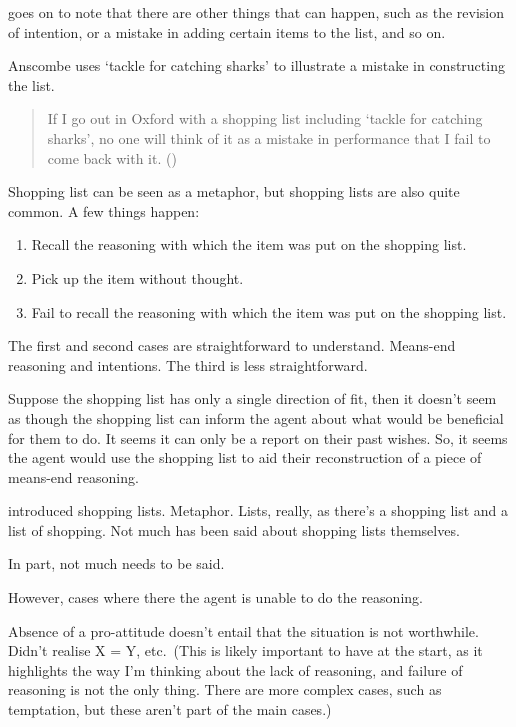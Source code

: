 \documentclass[10pt]{article}
\begin{document}
\citeauthor{Anscombe:1957aa} goes on to note that there are other things that can happen, such as the revision of intention, or a mistake in adding certain items to the list, and so on.

Anscombe uses `tackle for catching sharks' to illustrate a mistake in constructing the list.
\begin{quote}
  If I go out in Oxford with a shopping list including `tackle for catching sharks', no one will think of it as a mistake in performance that I fail to come back with it.\nolinebreak
  \mbox{}\hfill\mbox(\citeyear[56]{Anscombe:1957aa})
\end{quote}

Shopping list can be seen as a metaphor, but shopping lists are also quite common.
A few things happen:
\begin{enumerate}
\item Recall the reasoning with which the item was put on the shopping list.
\item Pick up the item without thought.
\item Fail to recall the reasoning with which the item was put on the shopping list.
\end{enumerate}

The first and second cases are straightforward to understand.
Means-end reasoning and intentions.
The third is less straightforward.




Suppose the shopping list has only a single direction of fit, then it doesn't seem as though the shopping list can inform the agent about what would be beneficial for them to do.
It seems it can only be a report on their past wishes.
So, it seems the agent would use the shopping list to aid their reconstruction of a piece of means-end reasoning.

\newpage

\citeauthor{Anscombe:1957aa} introduced shopping lists.
Metaphor.
Lists, really, as there's a shopping list and a list of shopping.
Not much has been said about shopping lists themselves.

In part, not much needs to be said.

However, cases where there the agent is unable to do the reasoning.



Absence of a pro-attitude doesn't entail that the situation is not worthwhile.
Didn't realise X = Y, etc.\
(This is likely important to have at the start, as it highlights the way I'm thinking about the lack of reasoning, and failure of reasoning is not the only thing.
There are more complex cases, such as temptation, but these aren't part of the main cases.)
\end{document}
